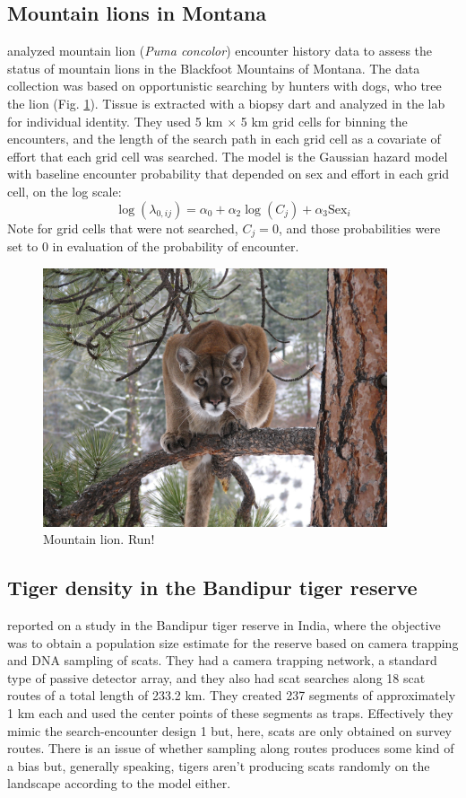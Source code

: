 \subsection{Mountain lions in Montana}

\citet{russell_etal:2012} analyzed mountain lion ({\it Puma concolor})
encounter history data to assess the status of mountain lions in the
Blackfoot Mountains of Montana.  The data collection was based on
opportunistic searching by hunters with dogs, who tree the lion
(Fig. \ref{searchencounter.fig.lion}).
Tissue is extracted with a biopsy dart and analyzed in the lab for
individual identity.
 They used 5 km $\times$ 5 km grid cells for
binning the encounters, and the length of the search path in each grid
cell as a covariate of effort that each grid cell was searched.  The
model is the Gaussian hazard model with baseline encounter probability
that depended on sex and effort in each grid cell, on the log scale:
\[
 \log(\lambda_{0,ij}) = \alpha_{0} + \alpha_{2} \log(C_{j}) + \alpha_{3} \mbox{Sex}_{i}
\]
Note for grid cells that were not searched, $C_{j} =0$, and those
probabilities were set to 0 in evaluation of the probability of
encounter.


\begin{figure}
\centering
\includegraphics[height=3in]{Ch15-searchencounter/figs/mountain_lion.jpg}
\caption{
Mountain lion.
Run!
}
\label{searchencounter.fig.lion}
\end{figure}


\subsection{Tiger density in the Bandipur tiger reserve}

\citet{gopalaswamy_etal:2012ecol} reported on a study in the Bandipur
tiger reserve in India, where the objective was to obtain a population
size estimate for the reserve based on camera trapping and DNA
sampling of scats.  They had a camera trapping network, a standard
type of passive detector array, and they also had scat searches along
18 scat routes of a total length of 233.2 km. They created 237
segments of approximately 1 km each and used the center points of
these segments as traps. Effectively they mimic the search-encounter
design 1 but, here, scats are only obtained on survey routes.
There is an issue of whether sampling along routes produces some kind
of a bias but, generally speaking, tigers aren't producing scats
randomly on the landscape according to the model either.


